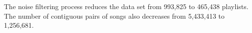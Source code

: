 The noise filtering process reduces the data set from 993,825 to 465,438 playlists. The number of contiguous pairs of songs also decreases from 5,433,413 to 1,256,681.
% 
% 
% 
% 
% 
% 
% 
% 
